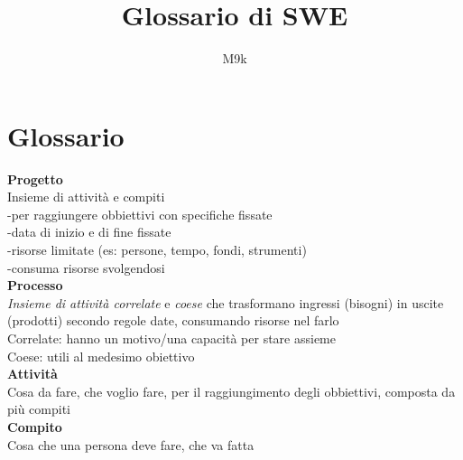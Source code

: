 \documentclass{article}
\begin{document}
\title{Glossario di SWE}
\author{M9k}
\maketitle

	
\section{Glossario}
		\textbf{Progetto}\\
		Insieme di attività e compiti\\
		-per raggiungere obbiettivi con specifiche fissate\\
		-data di inizio e di fine fissate\\
		-risorse limitate (es: persone, tempo, fondi, strumenti)\\
		-consuma risorse svolgendosi\\
			
		\textbf{Processo}\\
		\textit{Insieme di attività correlate} e \textit{coese} che trasformano ingressi (bisogni) in uscite (prodotti) secondo regole date, consumando risorse nel farlo\\
		Correlate: hanno un motivo/una capacità per stare assieme\\
		Coese: utili al medesimo obiettivo\\
		
		\textbf{Attività}\\
		Cosa da fare, che voglio fare, per il raggiungimento degli obbiettivi, composta da più compiti\\
		
		\textbf{Compito}\\
		Cosa che una persona deve fare, che va fatta\\
\end{document}
